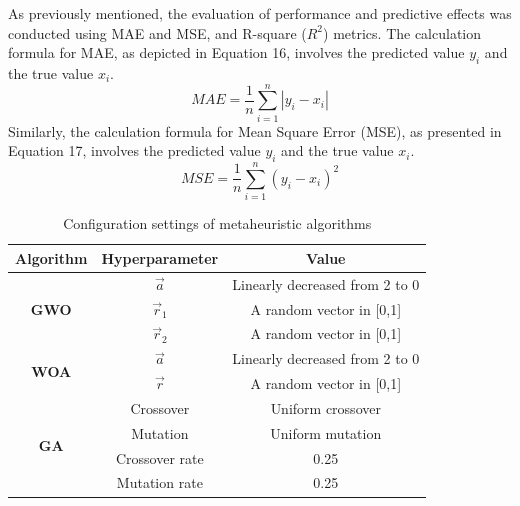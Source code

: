 \documentclass{article}
\begin{document}
As previously mentioned, the evaluation of performance and predictive effects was conducted using MAE and MSE, and R-square ($R^2$) metrics. The calculation formula for MAE, as depicted in Equation 16, involves the predicted value  $y_i$ and the true value $x_i$. 
\begin{equation}
MAE=  \frac{1}{n} \sum_{i=1}^n|y_i-x_i |
\end{equation}
Similarly, the calculation formula for Mean Square Error (MSE), as presented in Equation 17, involves the predicted value $y_i$ and the true value  $x_i$. 
\begin{equation}
MSE=  \frac{1}{n} \sum_{i=1}^n(y_i-x_i)^2
\end{equation}
\begin{table}[!htb]
\caption{Configuration settings of metaheuristic algorithms}
\begin{tabular}{|c|c|c|}
\hline
\textbf{Algorithm}            & \multicolumn{1}{c|}{\textbf{Hyperparameter}} & \multicolumn{1}{c|}{\textbf{Value}} \\ \hline
\multirow{3}{*}{\textbf{GWO}} & $\overrightarrow{a}$         & Linearly   decreased from 2 to 0    \\
                              & $\overrightarrow{r}_1$      & A random   vector in {[}0,1{]}      \\
                              & $\overrightarrow{r}_2$       & A random   vector in {[}0,1{]}      \\ \hline
\multirow{2}{*}{\textbf{WOA}} & $\overrightarrow{a}$          & Linearly   decreased from 2 to 0    \\
                              & $\overrightarrow{r}$          & A random   vector in {[}0,1{]}      \\ \hline
\multirow{4}{*}{\textbf{GA}}  & Crossover                                    & Uniform   crossover                 \\
                              & Mutation                                     & Uniform   mutation                  \\
                              & Crossover rate                               & 0.25                                \\
                              & Mutation rate                                & 0.25                                \\ \hline
\end{tabular}
\end{table}
\end{document}
